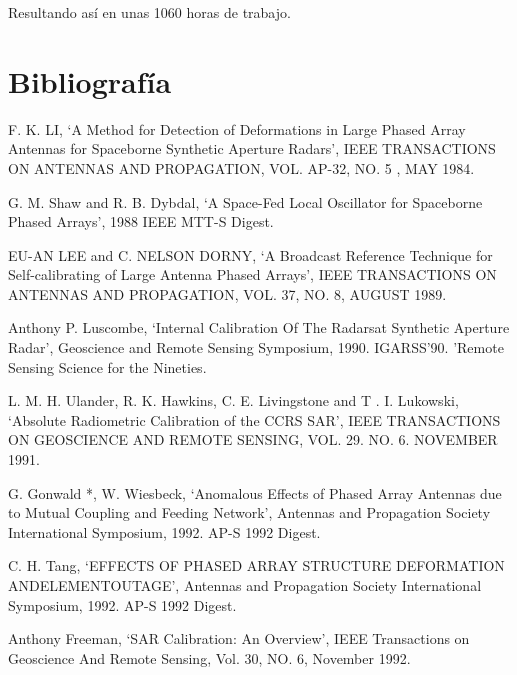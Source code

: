 \documentclass[a4paper,10pt]{article}
\begin{document}
Resultando así en unas 1060 horas de trabajo.


	\newpage
	\section{Bibliografía}
	
	\begin{enumerate}[ {[}1{]} ]
		\item \label{ppr:aligment1} F. K. LI, \enquote*{A Method for Detection 
		of Deformations in Large Phased Array Antennas for Spaceborne Synthetic
		Aperture Radars}, IEEE TRANSACTIONS ON ANTENNAS AND PROPAGATION, VOL. 
		AP-32, NO. 5 , MAY 1984.
		
		\item \label{ppr:aligment2} G. M. Shaw and R. B. Dybdal, \enquote*{A 
		Space-Fed Local Oscillator for Spaceborne Phased Arrays}, 1988 IEEE 
		MTT-S Digest.

		\item \label{ppr:brdcast1} EU-AN LEE and C. NELSON DORNY, \enquote*{A 
		Broadcast Reference Technique for Self-calibrating of Large Antenna 
		Phased Arrays}, IEEE TRANSACTIONS ON ANTENNAS AND PROPAGATION, VOL. 37,
		NO. 8, AUGUST 1989.
		
		\item \label{ppr:classic1} Anthony P. Luscombe, \enquote*{Internal 
		Calibration Of The Radarsat Synthetic Aperture Radar}, Geoscience and 
		Remote Sensing Symposium, 1990. IGARSS'90. 'Remote Sensing Science for 
		the Nineties.
		
		\item \label{ppr:absRad1} L. M. H. Ulander, R. K. Hawkins, C. E.
		Livingstone and T . I. Lukowski, \enquote*{Absolute Radiometric 
		Calibration of the CCRS SAR}, IEEE TRANSACTIONS ON GEOSCIENCE AND REMOTE
		SENSING, VOL. 29. NO. 6. NOVEMBER 1991.
		
		\item G. Gonwald *, W. Wiesbeck, \enquote*{Anomalous Effects of Phased 
		Array Antennas due to Mutual Coupling and Feeding Network}, Antennas and
		Propagation Society International Symposium, 1992. AP-S 1992 Digest.
		
		\item C. H. Tang, \enquote*{EFFECTS OF PHASED ARRAY STRUCTURE
		DEFORMATION ANDELEMENTOUTAGE}, Antennas and Propagation Society 
		International Symposium, 1992. AP-S 1992 Digest.
		
		\item \label{ppr:puncTrgt1} Anthony Freeman, \enquote*{SAR Calibration: 
		An Overview}, IEEE Transactions on Geoscience And Remote Sensing, Vol. 
		30, NO. 6, November 1992.
		

\end{enumerate}
\end{document}
